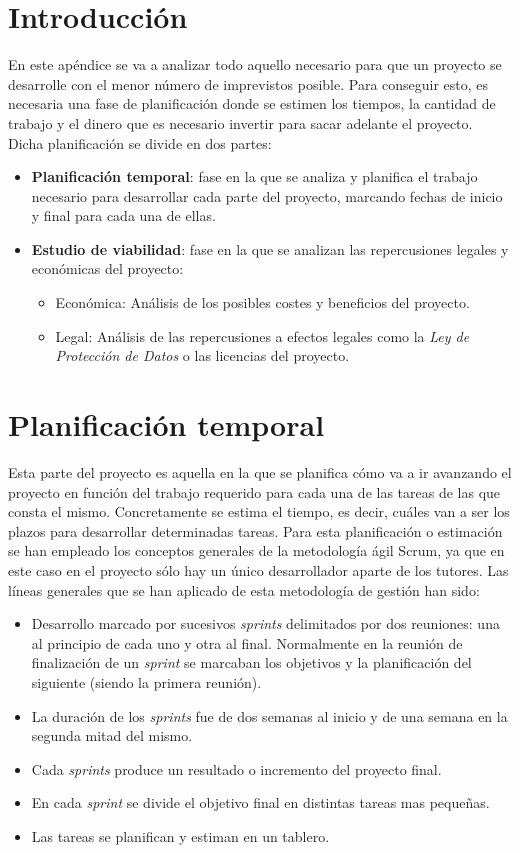 
\section{Introducción}
En este apéndice se va a analizar todo aquello necesario para que un proyecto se desarrolle con el menor número de imprevistos posible. Para conseguir esto, es necesaria una fase de planificación donde se estimen los tiempos, la cantidad de trabajo y el dinero que es necesario invertir para sacar adelante el proyecto.
Dicha planificación se divide en dos partes:
\begin{itemize}
	\item \textbf{Planificación temporal}: fase en la que se analiza y planifica el trabajo necesario para desarrollar cada parte del proyecto, marcando fechas de inicio y final para cada una de ellas.
	\item \textbf{Estudio de viabilidad}: fase en la que se analizan las repercusiones legales y económicas del proyecto:
	\begin{itemize}
		\item Económica: Análisis de los posibles costes y beneficios del proyecto.
		\item Legal: Análisis de las repercusiones a efectos legales como la \textit{Ley de Protección de Datos} o las licencias del proyecto.
	\end{itemize}
\end{itemize}

\section{Planificación temporal}
Esta parte del proyecto es aquella en la que se planifica cómo va a ir avanzando el proyecto en función del trabajo requerido para cada una de las tareas de las que consta el mismo.
Concretamente se estima el tiempo, es decir, cuáles van a ser los plazos para desarrollar determinadas tareas.
Para esta planificación o estimación se han empleado los conceptos generales de la metodología ágil Scrum, ya que en este caso en el proyecto sólo hay un único desarrollador aparte de los tutores. Las líneas generales que se han aplicado de esta metodología de gestión han sido:
\begin{itemize}
	\tightlist
	\item
	Desarrollo marcado por sucesivos \emph{sprints} delimitados por dos reuniones: una al principio de cada uno y otra al final. Normalmente en la reunión de finalización de un \emph{sprint} se marcaban los objetivos y la planificación del siguiente (siendo la primera reunión).
	\item
	La duración de los \emph{sprints} fue de dos semanas al inicio y de una semana en la segunda mitad del mismo.
	\item
	Cada \emph{sprints} produce un resultado o incremento del proyecto final.
	\item
	En cada \emph{sprint} se divide el objetivo final en distintas tareas mas pequeñas.
	\item
	Las tareas se planifican y estiman en un tablero.
\end{itemize}

